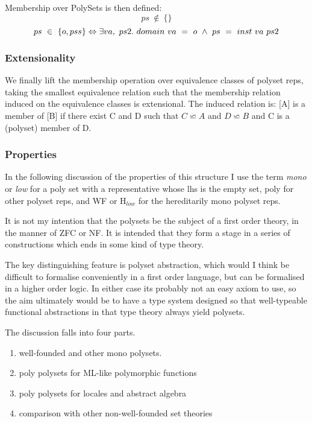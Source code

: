 \documentclass[numreferences]{rbjk}
\begin{document}
\begin{article}
Membership over PolySets is then defined:
\begin{displaymath}
ps\ \not\in\ \{\}
\end{displaymath}
\begin{displaymath}
ps\ \in\ \{o,pss\}\\
\Leftrightarrow\\
\exists va,\ ps2.\ domain\ va\ =\ o\ \wedge\ ps\ =\ inst\ va\ ps2
\end{displaymath}

\subsubsection{Extensionality}

We finally lift the membership operation over equivalence classes of polyset reps, taking the smallest equivalence relation such that the membership relation induced on the equivalence classes is extensional.
The induced relation is: [A] is a member of [B] if there exist C and D such that $C \backsimeq A$ and $D \backsimeq B$ and C is a (polyset) member of D.

\subsubsection{Properties}

In the following discussion of the properties of this structure I use the term {\it mono} or {\it low} for a poly set with a representative whose lhs is the empty set, poly for other polyset reps, and WF or H$_{low}$ for the hereditarily mono polyset reps.

It is not my intention that the polysets be the subject of a first order theory, in the manner of ZFC or NF.
It is intended that they form a stage in a series of constructions which ends in some kind of type theory.

The key distinguishing feature is polyset abstraction, which would I think be difficult to formalise conveniently in a first order language, but can be formalised in a higher order logic.
In either case its probably not an easy axiom to use, so the aim ultimately would be to have a type system designed so that well-typeable functional abstractions in that type theory always yield polysets.

The discussion falls into four parts.
\begin{enumerate}
\item well-founded and other mono polysets.
\item poly polysets for ML-like polymorphic functions
\item poly polysets for locales and abstract algebra
\item comparison with other non-well-founded set theories
\end{enumerate}


\end{article}
\end{document}
